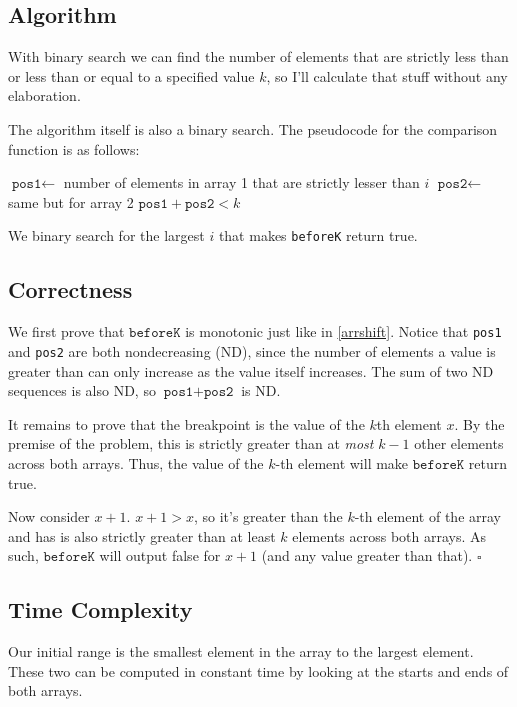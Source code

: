 \documentclass[12pt]{article}
\begin{document}
\subsection{Algorithm}

With binary search we can find the number of elements that are strictly
less than or less than or equal to a specified value $k$,
so I'll calculate that stuff without any elaboration.

The algorithm itself is also a binary search.
The pseudocode for the comparison function is as follows:
\begin{algorithmic}[1]
        \State $\texttt{pos1} \gets $ number of elements in array 1 that are strictly lesser than $i$
        \State $\texttt{pos2} \gets $ same but for array 2
        \State \Return $\texttt{pos1}+\texttt{pos2} < k$
    \EndProcedure
\end{algorithmic}
We binary search for the largest $i$ that makes \texttt{beforeK} return true.

\subsection{Correctness}

We first prove that $\texttt{beforeK}$ is monotonic just like in \ref{arrshift}.
Notice that \texttt{pos1} and \texttt{pos2} are both nondecreasing (ND),
since the number of elements a value is greater than can only increase
as the value itself increases.
The sum of two ND sequences is also ND, so $\texttt{pos1}+\texttt{pos2}$ is ND.

It remains to prove that the breakpoint is the value of the $k$th element $x$.
By the premise of the problem, this is strictly greater than at \textit{most}
$k-1$ other elements across both arrays.
Thus, the value of the $k$-th element will make $\texttt{beforeK}$ return true.

Now consider $x+1$.
$x+1>x$, so it's greater than the $k$-th element of the array and has
is also strictly greater than at least $k$ elements across both arrays.
As such, $\texttt{beforeK}$ will output false for $x+1$
(and any value greater than that). $\square$

\subsection{Time Complexity}

Our initial range is the smallest element in the array to the largest element.
These two can be computed in constant time
by looking at the starts and ends of both arrays.
\end{document}
